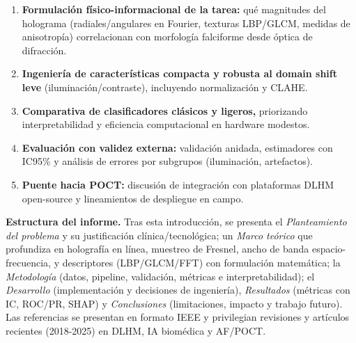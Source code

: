 \begin{enumerate}
\item \textbf{Formulación físico-informacional de la tarea:} qué magnitudes del holograma (radiales/angulares en Fourier, texturas LBP/GLCM, medidas de anisotropía) correlacionan con morfología falciforme desde óptica de difracción.

\item \textbf{Ingeniería de características compacta y robusta al domain shift leve} (iluminación/contraste), incluyendo normalización y CLAHE.

\item \textbf{Comparativa de clasificadores clásicos y ligeros,} priorizando interpretabilidad y eficiencia computacional en hardware modestos.

\item \textbf{Evaluación con validez externa:} validación anidada, estimadores con IC95\% y análisis de errores por subgrupos (iluminación, artefactos).

\item \textbf{Puente hacia POCT:} discusión de integración con plataformas DLHM open-source y lineamientos de despliegue en campo.
\end{enumerate}

\textbf{Estructura del informe.} Tras esta introducción, se presenta el \textit{Planteamiento del problema} y su justificación clínica/tecnológica; un \textit{Marco teórico} que profundiza en holografía en línea, muestreo de Fresnel, ancho de banda espacio-frecuencia, y descriptores (LBP/GLCM/FFT) con formulación matemática; la \textit{Metodología} (datos, pipeline, validación, métricas e interpretabilidad); el \textit{Desarrollo} (implementación y decisiones de ingeniería), \textit{Resultados} (métricas con IC, ROC/PR, SHAP) y \textit{Conclusiones} (limitaciones, impacto y trabajo futuro). Las referencias se presentan en formato IEEE y privilegian revisiones y artículos recientes (2018-2025) en DLHM, IA biomédica y AF/POCT.